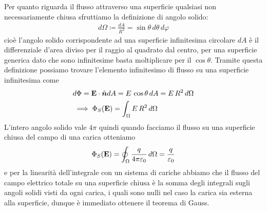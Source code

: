 Per quanto riguarda il flusso attraverso una superficie qualsiasi non necessariamente chiusa sfruttiamo la definizione di angolo solido:
\begin{align}
  d\Omega \coloneq \frac{dA}{R^2} = \sin\theta \,d\theta\, d\varphi
\end{align}
cioè l'angolo solido corrispondente ad una superficie infinitesima circolare $ dA $ è il differenziale d'area diviso per il raggio al quadrato dal centro, 
per una superficie generica dato che sono infinitesime basta moltiplicare per il $ \cos\theta $. Tramite questa definizione possiamo trovare l'elemento 
infinitesimo di flusso su una superficie infinitesima come
\begin{align}
  &d\Phi = \mathbf{E}\cdot \hat{\boldsymbol{n}} dA = E \, \cos\theta \, dA = E\, R^2 \,d\Omega
  \\
  &\implies \Phi_S(\mathbf{E}) = \int_\Omega E \, R^2 \,d\Omega
\end{align}
L'intero angolo solido vale $ 4\pi $ quindi quando facciamo il flusso su una superficie chiusa del campo di una carica otteniamo
\begin{align}
  \Phi_S(\mathbf{E}) = \oint_\Omega \frac{q}{4\pi \varepsilon_0} \,d\Omega = \frac{q}{\varepsilon_0}
\end{align}
e per la linearità dell'integrale con un sistema di cariche abbiamo che il flusso del campo elettrico totale su una superficie chiusa è la somma degli 
integrali sugli angoli solidi visti da ogni carica, i quali sono nulli nel caso la carica sia esterna alla superficie, dunque è immediato ottenere il 
teorema di Gauss.


